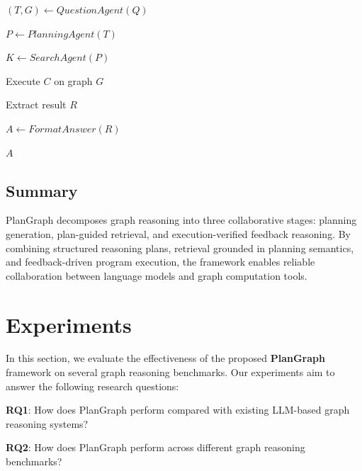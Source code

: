 \documentclass[sigconf,review,anonymous]{acmart}
\begin{document}
\begin{algorithm}[t]
\caption{PlanGraph Inference Pipeline}
\label{alg:plangraph}


$(T,G) \leftarrow QuestionAgent(Q)$

$P \leftarrow PlanningAgent(T)$

$K \leftarrow SearchAgent(P)$


Execute $C$ on graph $G$

Extract result $R$

$A \leftarrow FormatAnswer(R)$

\Return $A$

\end{algorithm}

\subsection{Summary}

PlanGraph decomposes graph reasoning into three collaborative
stages: planning generation, plan-guided retrieval, and
execution-verified feedback reasoning. By combining
structured reasoning plans, retrieval grounded in planning
semantics, and feedback-driven program execution, the
framework enables reliable collaboration between language
models and graph computation tools.

\section{Experiments}

In this section, we evaluate the effectiveness of the proposed
\textbf{PlanGraph} framework on several graph reasoning benchmarks.
Our experiments aim to answer the following research questions:

\textbf{RQ1}: How does PlanGraph perform compared with existing
LLM-based graph reasoning systems?

\textbf{RQ2}: How does PlanGraph perform across different
graph reasoning benchmarks?
\end{document}
